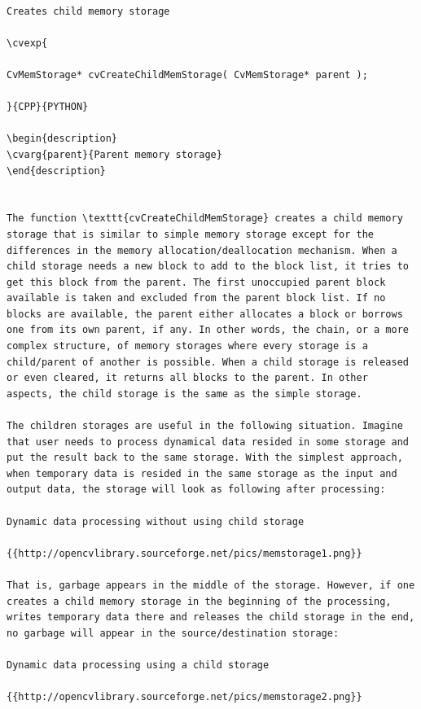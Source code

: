 \begin{verbatim}

Creates child memory storage

\cvexp{

CvMemStorage* cvCreateChildMemStorage( CvMemStorage* parent );

}{CPP}{PYTHON}

\begin{description}
\cvarg{parent}{Parent memory storage}
\end{description}


The function \texttt{cvCreateChildMemStorage} creates a child memory storage that is similar to simple memory storage except for the differences in the memory allocation/deallocation mechanism. When a child storage needs a new block to add to the block list, it tries to get this block from the parent. The first unoccupied parent block available is taken and excluded from the parent block list. If no blocks are available, the parent either allocates a block or borrows one from its own parent, if any. In other words, the chain, or a more complex structure, of memory storages where every storage is a child/parent of another is possible. When a child storage is released or even cleared, it returns all blocks to the parent. In other aspects, the child storage is the same as the simple storage.

The children storages are useful in the following situation. Imagine that user needs to process dynamical data resided in some storage and put the result back to the same storage. With the simplest approach, when temporary data is resided in the same storage as the input and output data, the storage will look as following after processing:

Dynamic data processing without using child storage

{{http://opencvlibrary.sourceforge.net/pics/memstorage1.png}}

That is, garbage appears in the middle of the storage. However, if one creates a child memory storage in the beginning of the processing, writes temporary data there and releases the child storage in the end, no garbage will appear in the source/destination storage:

Dynamic data processing using a child storage

{{http://opencvlibrary.sourceforge.net/pics/memstorage2.png}}


\end{verbatim}
\label{ReleaseMemStorage}
